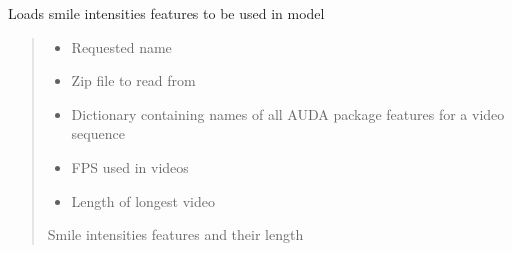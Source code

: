 \documentclass[letterpaper,10pt,english]{sphinxmanual}
\begin{document}
\begin{fulllineitems}
\label{\detokenize{dataset:dataset.load_features_si}}
\pysigstartsignatures
{}
\pysigstopsignatures
\sphinxAtStartPar
Loads smile intensities features to be used in model
\begin{quote}\begin{description}
\begin{itemize}
\item {} 
\sphinxAtStartPar
{} \textendash{} Requested name

\item {} 
\sphinxAtStartPar
{} \textendash{} Zip file to read from

\item {} 
\sphinxAtStartPar
{} \textendash{} Dictionary containing names of all AUDA package features for a video sequence

\item {} 
\sphinxAtStartPar
{} \textendash{} FPS used in videos

\item {} 
\sphinxAtStartPar
{} \textendash{} Length of longest video

\end{itemize}

\sphinxAtStartPar
Smile intensities features and their length

\end{description}\end{quote}

\end{fulllineitems}

\end{document}
